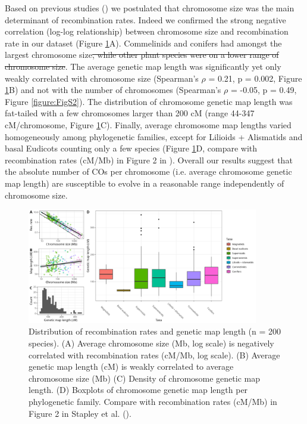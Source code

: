 \documentclass{article}
\providecommand{\DIFdeltex}[1]{{\protect\color{red}\sout{#1}}}                      %
\providecommand{\DIFdelbegin}{} %
\providecommand{\DIFdelend}{} %
\providecommand{\DIFdel}[1]{\texorpdfstring{\DIFdeltex{#1}}{}} %
\newcommand{\DIFscaledelfig}{0.5}
\newlength{\DIFdelgraphicswidth} %
\newlength{\DIFdelgraphicsheight} %
\newcommand{\DIFdelincludegraphics}[2][]{%
\sbox{\DIFdelgraphicsbox}{\DIFOincludegraphics[#1]{#2}}%
\settoboxwidth{\DIFdelgraphicswidth}{\DIFdelgraphicsbox} %
\settoboxtotalheight{\DIFdelgraphicsheight}{\DIFdelgraphicsbox} %
\scalebox{\DIFscaledelfig}{%
\parbox[b]{\DIFdelgraphicswidth}{\usebox{\DIFdelgraphicsbox}\\[-\baselineskip] \rule{\DIFdelgraphicswidth}{0em}}\llap{\resizebox{\DIFdelgraphicswidth}{\DIFdelgraphicsheight}{%
\setlength{\unitlength}{\DIFdelgraphicswidth}%
\begin{picture}(1,1)%
\thicklines\linethickness{2pt} %
{\color[rgb]{1,0,0}\put(0,0){\framebox(1,1){}}}%
{\color[rgb]{1,0,0}\put(0,0){\line( 1,1){1}}}%
{\color[rgb]{1,0,0}\put(0,1){\line(1,-1){1}}}%
\end{picture}%
}\hspace*{3pt}}} %
} %
\DeclareRobustCommand{\DIFdelbegin}{\DIFOdelbegin \let\includegraphics\DIFdelincludegraphics} %
\DeclareRobustCommand{\DIFdelend}{\DIFOaddend \let\includegraphics\DIFOincludegraphics} %
\begin{document}
Based on previous studies (\cite{brazierDiversityDeterminantsRecombination2022b,haenelMetaanalysisChromosomescaleCrossover2018}) we postulated that chromosome size was the main determinant of recombination rates. Indeed we confirmed the strong negative correlation (log-log relationship) between chromosome size and recombination rate in our dataset (Figure \ref{figure:Fig1}A). Commelinids and conifers had amongst the largest chromosome size\DIFdelbegin \DIFdel{, while other plant species were on a lower range of chromosome size}\DIFdelend . The average genetic map length was significantly yet only weakly correlated with chromosome size (Spearman’s $\rho$ = 0.21, p = 0.002, Figure \ref{figure:Fig1}B) and not with the number of chromosomes (Spearman’s $\rho$ = -0.05, p = 0.49, Figure \ref{figure:FigS2}). The distribution of chromosome genetic map length was fat-tailed with a few chromosomes larger than 200 cM (range 44-347 cM/chromosome, Figure \ref{figure:Fig1}C). Finally, average chromosome map lengths varied homogeneously among phylogenetic families, except for Lilioids + Alismatids and basal Eudicots counting only a few species (Figure \ref{figure:Fig1}D, compare with recombination rates (cM/Mb) in Figure 2 in \cite{stapleyVariationRecombinationFrequency2017}). Overall our results suggest that the absolute number of COs per chromosome (i.e. average chromosome genetic map length) are susceptible to evolve in a reasonable range independently of chromosome size.


\begin{figure}[h!]
  \includegraphics[width=0.9\textwidth]{figures/Fig1.jpeg}
  \centering
  \caption{Distribution of recombination rates and genetic map length  (n = 200 species). (A) Average chromosome size (Mb, log scale) is negatively correlated with recombination rates (cM/Mb, log scale). (B) Average genetic map length (cM) is weakly correlated to average chromosome size (Mb) (C) Density of chromosome genetic map length. (D) Boxplots of chromosome genetic map length per phylogenetic family. Compare with recombination rates (cM/Mb) in Figure 2 in Stapley et al. (\citeyear{stapleyVariationRecombinationFrequency2017}).
  }
  \label{figure:Fig1}
\end{figure}
\end{document}
